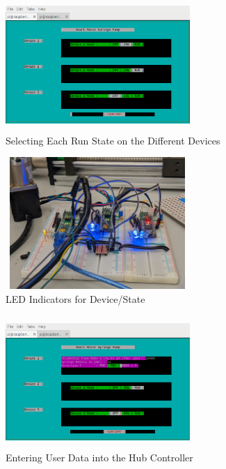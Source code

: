 \documentclass[journal]{IEEEtran}
\begin{document}
            \begin{figure}[H]
                \centering
                \includegraphics[width=7cm, height=5cm]{GUI_2}
                \caption{Selecting Each Run State on the Different Devices}
                \label{fig:GUI2}
            \end{figure}
            
            
            \begin{figure}[H]
                \centering
                \includegraphics[width=7cm, height=5cm]{GUI_2_LED}
                \caption{LED Indicators for Device/State}
                \label{fig:GUI2_L}
            \end{figure}
            
            \begin{figure}[H]
                \centering
                \includegraphics[width=7cm, height=5cm]{GUI_4}
                \caption{Entering User Data into the Hub Controller}
                \label{fig:GUI4}
            \end{figure}
            
\end{document}
